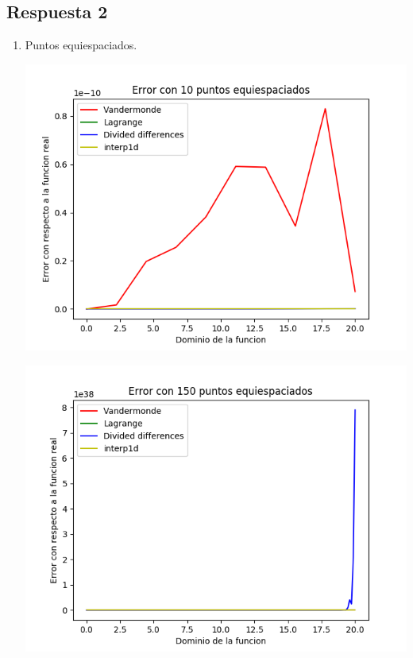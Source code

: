 \documentclass[spanish, fleqn]{article}
\begin{document}
\subsection{Respuesta 2}

\begin{enumerate}
    \item Puntos equiespaciados.
    
\includegraphics[scale=1.0]{Figure_1.png}

\includegraphics[scale=1.0]{Figure_2.png}


\end{enumerate}
\end{document}
